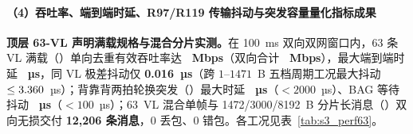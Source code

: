 
\FloatBarrier
\paragraph{（4）吞吐率、端到端时延、R97/R119 传输抖动与突发容量量化指标成果}

\textbf{顶层  63-VL 声明满载规格与混合分片实测。}在 100~ms 双向双网窗口内，63 条 VL 满载（）单向去重有效吞吐率达 \textbf{\ThruSixtyThree~Mbps}（双向合计 \textbf{\ThruSixtyThreeBi~Mbps}），最大端到端时延 \textbf{\LatSixtyThreePMax~µs}，同 VL 极差抖动仅 \textbf{0.016~µs}（跨 $1\text{--}1471$~B 五档周期工况最大抖动 $\le3.360$~µs）；背靠背两拍轮换突发（）最大时延 \textbf{\LatSixtyThreeBTwo~µs}（$<2000$~µs）、BAG 等待抖动 \textbf{\JitSixtyThreeBTwo~µs}（$<100$~µs）；63~VL 混合单帧与 1472/3000/8192~B 分片长消息（）双向无损交付 \textbf{12,206 条消息}，0 丢包、0 错包。各工况见表~\ref{tab:s3_perf63}。

